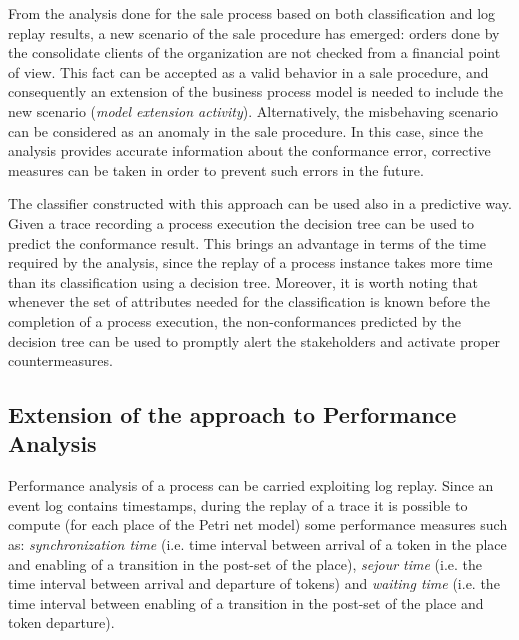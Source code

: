 \documentclass{llncs}
\begin{document}
{From the analysis done for the sale process based on both classification and log replay results, a new scenario of the  sale procedure has emerged: orders done by the consolidate clients of the organization are not checked from a financial point of view. This fact can be accepted as a valid  behavior in a sale procedure, and consequently an extension of the business process model is needed to include the new scenario (\emph{model extension activity}). Alternatively, the misbehaving scenario can be considered as an anomaly in the sale procedure. In this case, since the analysis provides accurate information about the conformance error, corrective measures can be taken in order to prevent such errors in the future.

The classifier constructed with this approach can be used also in a predictive way. Given a trace recording a process execution the decision tree can be used to predict the conformance result. This brings an advantage in terms of the time required by the analysis, since the replay of a process instance  takes more time than its  classification using a decision tree. Moreover, it is worth noting that whenever the set of attributes needed for the classification is  known before the completion of a process execution, the non-conformances predicted by the decision tree can be used to  promptly alert the stakeholders and activate proper countermeasures. 

\subsection{Extension of the approach to Performance Analysis}\label{ClassPerf}
Performance analysis of a process can be carried exploiting log replay. Since an event log contains timestamps, during the replay of a trace it is possible to compute (for each place of the Petri net model) some performance measures such as: \emph{synchronization time} (i.e. time interval between arrival of a token in the place and enabling of a transition in the post-set of the place), \emph{sejour time} (i.e. the time interval between arrival and departure of tokens) and \emph{waiting time} (i.e. the time interval between enabling of a transition in the post-set of the place and token departure).

}
\end{document}

